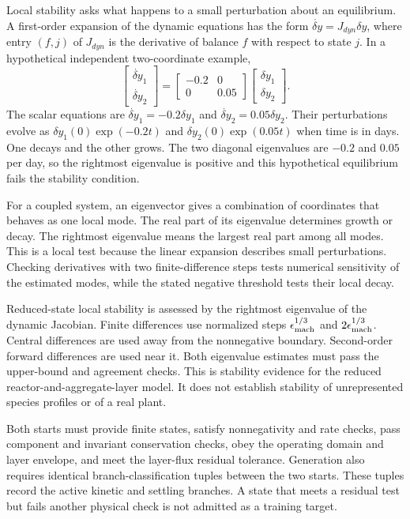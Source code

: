 Local stability asks what happens to a small perturbation about an equilibrium. A first-order expansion of the dynamic equations has the form $\dot{\delta y}=J_{dyn}\delta y$, where entry $(f,j)$ of $J_{dyn}$ is the derivative of balance $f$ with respect to state $j$. In a hypothetical independent two-coordinate example,
\[
\begin{bmatrix}\dot{\delta y}_1\\\dot{\delta y}_2\end{bmatrix}
=\begin{bmatrix}-0.2&0\\0&0.05\end{bmatrix}
\begin{bmatrix}\delta y_1\\\delta y_2\end{bmatrix}.
\]
The scalar equations are $\dot{\delta y}_1=-0.2\delta y_1$ and $\dot{\delta y}_2=0.05\delta y_2$. Their perturbations evolve as $\delta y_1(0)\exp(-0.2t)$ and $\delta y_2(0)\exp(0.05t)$ when time is in days. One decays and the other grows. The two diagonal eigenvalues are $-0.2$ and $0.05$ per day, so the rightmost eigenvalue is positive and this hypothetical equilibrium fails the stability condition.

For a coupled system, an eigenvector gives a combination of coordinates that behaves as one local mode. The real part of its eigenvalue determines growth or decay. The rightmost eigenvalue means the largest real part among all modes. This is a local test because the linear expansion describes small perturbations. Checking derivatives with two finite-difference steps tests numerical sensitivity of the estimated modes, while the stated negative threshold tests their local decay.

Reduced-state local stability is assessed by the rightmost eigenvalue of the dynamic Jacobian. Finite differences use normalized steps $\epsilon_{\rm mach}^{1/3}$ and $2\epsilon_{\rm mach}^{1/3}$. Central differences are used away from the nonnegative boundary. Second-order forward differences are used near it. Both eigenvalue estimates must pass the upper-bound and agreement checks. This is stability evidence for the reduced reactor-and-aggregate-layer model. It does not establish stability of unrepresented species profiles or of a real plant.

Both starts must provide finite states, satisfy nonnegativity and rate checks, pass component and invariant conservation checks, obey the operating domain and layer envelope, and meet the layer-flux residual tolerance. Generation also requires identical branch-classification tuples between the two starts. These tuples record the active kinetic and settling branches. A state that meets a residual test but fails another physical check is not admitted as a training target.

